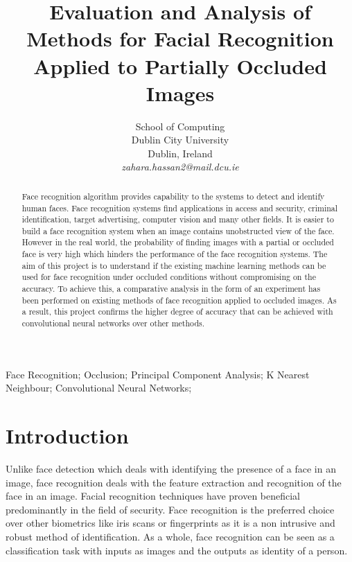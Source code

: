 \documentclass[conference]{IEEEtran}
\begin{document}
\title{Evaluation and Analysis of Methods for Facial Recognition Applied to Partially Occluded Images}

\author{
School of Computing\\
Dublin City University\\
Dublin, Ireland \\
\textit{zahara.hassan2@mail.dcu.ie
}}

\maketitle



\begin{abstract}
Face recognition algorithm provides capability to the systems to detect and identify human faces. Face recognition systems find applications in access and security, criminal identification, target advertising, computer vision and many other fields. It is easier to build a face recognition system when an image contains unobstructed view of the face. However in the real world, the probability of finding images with a partial or occluded face is very high which hinders the performance of the face recognition systems. The aim of this project is to understand if the existing machine learning methods can be used for face recognition under occluded conditions without compromising on the accuracy. To achieve this, a comparative analysis in the form of an experiment has been performed on existing methods of face recognition applied to occluded images. As a result, this project confirms the higher degree of accuracy that can be achieved with convolutional neural networks over other methods.
\end{abstract}

\begin{IEEEkeywords}
Face Recognition; Occlusion; Principal Component Analysis; K Nearest Neighbour; Convolutional Neural Networks;

\end{IEEEkeywords}

\section{Introduction}
\label{sec: 1.introduction}

Unlike face detection which deals with identifying the presence of a face in an image, face recognition deals with the feature extraction and recognition of the face in an image. Facial recognition techniques have proven beneficial predominantly in the field of security. Face recognition is the preferred choice over other biometrics like iris scans or fingerprints as it is a non intrusive and robust method of identification. As a whole, face recognition can be seen as a classification task with inputs as images and the outputs as identity of a person. 
\end{document}
